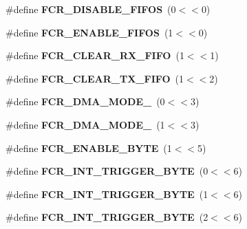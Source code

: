 \begin{DoxyCompactItemize}
\item 
\mbox{\label{group__hal__dos_ga50ff8e2789f5f8485ad903fa36cb5ff4}} 
\#define {\bfseries F\+C\+R\+\_\+\+D\+I\+S\+A\+B\+L\+E\+\_\+\+F\+I\+F\+OS}~(0$<$$<$0)
\item 
\mbox{\label{group__hal__dos_gacbbf96e0ad7b0c0ce83ded2a69b7edd6}} 
\#define {\bfseries F\+C\+R\+\_\+\+E\+N\+A\+B\+L\+E\+\_\+\+F\+I\+F\+OS}~(1$<$$<$0)
\item 
\mbox{\label{group__hal__dos_gaab7aea2b0a8ad9fbaf3e59d3f069c38c}} 
\#define {\bfseries F\+C\+R\+\_\+\+C\+L\+E\+A\+R\+\_\+\+R\+X\+\_\+\+F\+I\+FO}~(1$<$$<$1)
\item 
\mbox{\label{group__hal__dos_ga37c91cd823b315b67cb9d1bbf902feb4}} 
\#define {\bfseries F\+C\+R\+\_\+\+C\+L\+E\+A\+R\+\_\+\+T\+X\+\_\+\+F\+I\+FO}~(1$<$$<$2)
\item 
\mbox{\label{group__hal__dos_gae6161db9bf7143fe70cf25f70998c9c0}} 
\#define {\bfseries F\+C\+R\+\_\+\+D\+M\+A\+\_\+\+M\+O\+D\+E\+\_}~(0$<$$<$3)
\item 
\mbox{\label{group__hal__dos_gac313793a646e3df0162722cb7ae49ef1}} 
\#define {\bfseries F\+C\+R\+\_\+\+D\+M\+A\+\_\+\+M\+O\+D\+E\+\_}~(1$<$$<$3)
\item 
\mbox{\label{group__hal__dos_gafc8e8e20ec7621118f93a5bf7bc81c4b}} 
\#define {\bfseries F\+C\+R\+\_\+\+E\+N\+A\+B\+L\+E\+\_\+B\+Y\+TE}~(1$<$$<$5)
\item 
\mbox{\label{group__hal__dos_gafb61755694cecd05881690c0c3f3654f}} 
\#define {\bfseries F\+C\+R\+\_\+\+I\+N\+T\+\_\+\+T\+R\+I\+G\+G\+E\+R\+\_\+B\+Y\+TE}~(0$<$$<$6)
\item 
\mbox{\label{group__hal__dos_gaa16e7c8893fa44bb53381f93cbc2ba27}} 
\#define {\bfseries F\+C\+R\+\_\+\+I\+N\+T\+\_\+\+T\+R\+I\+G\+G\+E\+R\+\_\+B\+Y\+TE}~(1$<$$<$6)
\item 
\mbox{\label{group__hal__dos_gabeabe9b8e7dd748b99ffa6472fe0b3ef}} 
\#define {\bfseries F\+C\+R\+\_\+\+I\+N\+T\+\_\+\+T\+R\+I\+G\+G\+E\+R\+\_\+B\+Y\+TE}~(2$<$$<$6)

\end{DoxyCompactItemize}
